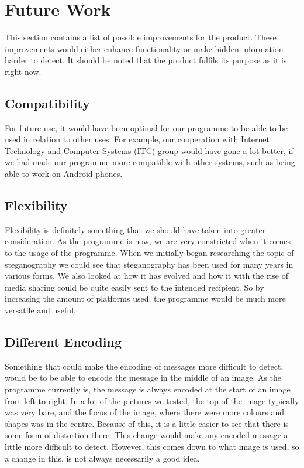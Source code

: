 \section{Future Work}
This section contains a list of possible improvements for the product.
These improvements would either enhance functionality or make hidden information harder to detect.
It should be noted that the product fulfils its purpose as it is right now.

\subsection{Compatibility}
For future use, it would have been optimal for our programme to be able to be used in relation to other uses.
For example, our cooperation with Internet Technology and Computer Systems (ITC) group would have gone a lot better, if we had made our programme more compatible with other systems, such as being able to work on Android phones.

\subsection{Flexibility}
Flexibility is definitely something that we should have taken into greater consideration.
As the programme is now, we are very constricted when it comes to the usage of the programme.
When we initially began researching the topic of steganography we could see that steganography has been used for many years in various forms.
We also looked at how it has evolved and how it with the rise of media sharing could be quite easily sent to the intended recipient.
So by increasing the amount of platforms used, the programme would be much more versatile and useful.

\subsection{Different Encoding}
Something that could make the encoding of messages more difficult to detect, would be to be able to encode the message in the middle of an image.
As the programme currently is,  the message is always encoded at the start of an image from left to right.
In a lot of the pictures we tested, the top of the image typically was very bare, and the focus of the image, where there were more colours and shapes was in the centre.
Because of this, it is a little easier to see that there is some form of distortion there.
This change would make any encoded message a little more difficult to detect.
However, this comes down to what image is used, so a change in this, is not always necessarily a good idea.

